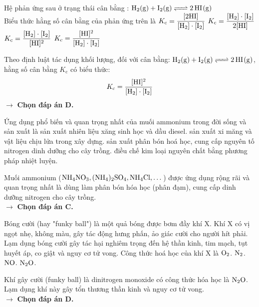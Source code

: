 \documentclass[11pt,a4paper]{article}
\begin{document}
\begin{ex}%
Hệ phản ứng sau ở trạng thái cân bằng : $\ce{H2(g) + I2(g) <=> 2HI(g)}$\\
Biểu thức hằng số cân bằng của phản ứng trên là
\choice
{$K_\text{c} = \dfrac{[2\ce{HI}]}{[\ce{H2}]\cdot[\ce{I2}]}$}
{$K_\text{c} = \dfrac{[\ce{H2}]\cdot[\ce{I2}]}{2[\ce{HI}]}$}
{$K_\text{c} = \dfrac{[\ce{H2}]\cdot[\ce{I2}]}{[\ce{HI}]^2}$}
{\True $K_\text{c} = \dfrac{[\ce{HI}]^2}{[\ce{H2}]\cdot[\ce{I2}]}$}
\begin{loigiai}
Theo định luật tác dụng khối lượng, đối với cân bằng: $\ce{H2(g) + I2(g) <=> 2HI(g)}$, hằng số cân bằng $K_\text{c}$ có biểu thức:\\
$$K_\text{c} = \dfrac{[\ce{HI}]^2}{[\ce{H2}]\cdot[\ce{I2}]}$$
$\rightarrow$ \textbf{Chọn đáp án D.}
\end{loigiai}
\end{ex}

\begin{ex}%
Ứng dụng phổ biến và quan trọng nhất của muối ammonium trong đời sống và sản xuất là
\choice
{sản xuất nhiên liệu xăng sinh học và dầu diesel.}
{sản xuất xi măng và vật liệu chịu lửa trong xây dựng.}
{\True sản xuất phân bón hoá học, cung cấp nguyên tố nitrogen dinh dưỡng cho cây trồng.}
{điều chế kim loại nguyên chất bằng phương pháp nhiệt luyện.}
\begin{loigiai}
Muối ammonium ($\ce{NH4NO3, (NH4)2SO4, NH4Cl},\dots$) được ứng dụng rộng rãi và quan trọng nhất là dùng làm phân bón hóa học (phân đạm), cung cấp dinh dưỡng nitrogen cho cây trồng.\\
$\rightarrow$ \textbf{Chọn đáp án C.}
\end{loigiai}
\end{ex}

\begin{ex}%
Bóng cười (hay "funky ball") là một quả bóng được bơm đầy khí X. Khí X có vị ngọt nhẹ, không màu, gây tác động hưng phấn, ảo giác cười cho người hít phải. Lạm dụng bóng cười gây tác hại nghiêm trọng đến hệ thần kinh, tim mạch, tụt huyết áp, co giật và nguy cơ tử vong. Công thức hoá học của khí X là
\choice
{$\ce{O2}$.}
{$\ce{N2}$.}
{$\ce{NO}$.}
{\True $\ce{N2O}$.}
\begin{loigiai}
Khí gây cười (funky ball) là dinitrogen monoxide có công thức hóa học là $\ce{N2O}$. Lạm dụng khí này gây tổn thương thần kinh và nguy cơ tử vong.\\
$\rightarrow$ \textbf{Chọn đáp án D.}
\end{loigiai}
\end{ex}
\end{document}
